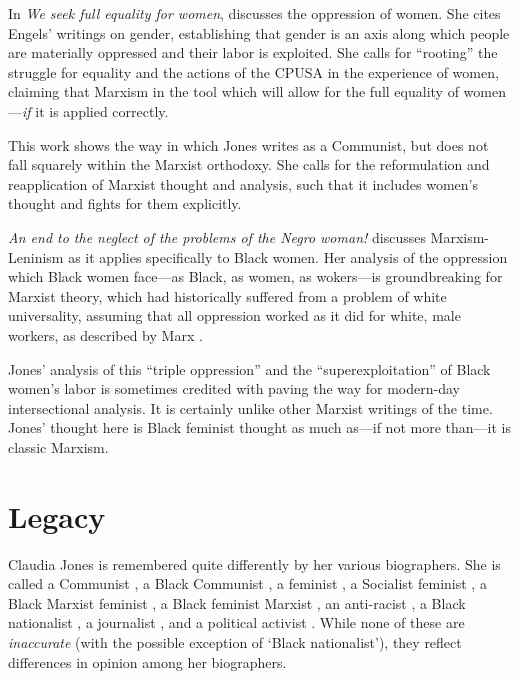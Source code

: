 \documentclass[man,12pt,natbib]{apa6}
\begin{document}
In \emph{We seek full equality for women}, \citet{Jones49b} discusses the
oppression of women. She cites Engels' writings on gender, establishing that
gender is an axis along which people are materially oppressed and their labor
is exploited. She calls for ``rooting'' the struggle for equality and the
actions of the CPUSA in the experience of women, claiming that Marxism in the
tool which will allow for the full equality of women---\emph{if} it is applied
correctly.

This work shows the way in which Jones writes as a Communist, but does not fall
squarely within the Marxist orthodoxy. She calls for the reformulation and
reapplication of Marxist thought and analysis, such that it includes women's
thought and fights for them explicitly.

\emph{An end to the neglect of the problems of the Negro woman!} \citep{Jones49a}
discusses Marxism-Leninism as it applies specifically to Black women. Her
analysis of the oppression which Black women face---as Black, as women, as
wokers---is groundbreaking for Marxist theory, which had historically suffered
from a problem of white universality, assuming that all oppression worked as it
did for white, male workers, as described by Marx \citep{Wilderson03}.

Jones' analysis of this ``triple oppression'' and the ``superexploitation''
\citep{Davies08} of Black women's labor is sometimes credited with paving the 
way for modern-day intersectional analysis. It is certainly unlike other
Marxist writings of the time. Jones' thought here is Black feminist thought
as much as---if not more than---it is classic Marxism.


\section{Legacy}

Claudia Jones is remembered quite differently by her various biographers. She
is called a Communist \citep{Lalkar, Davis15}, a Black Communist
\citep{Davies08, Howard13, McKittrick08}, a feminist \citep{Davis15,
	McClendon96}, a Socialist feminist \citep{Lynn14}, a Black Marxist feminist
\citep{OBrien14}, a Black feminist Marxist \citep{Johnson08}, an anti-racist
\citep{Davis15}, a Black nationalist \citep{McClendon96}, a journalist
\citep{Hinds08, McClendon96}, and a political activist \citep{McClendon96}.
While none of these are \emph{inaccurate} (with the possible exception of
`Black nationalist'), they reflect differences in opinion among her
biographers.
\end{document}
